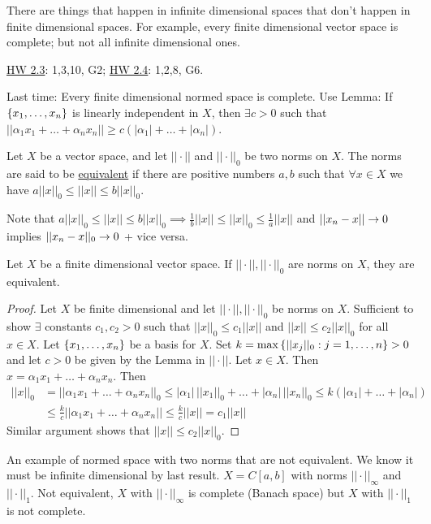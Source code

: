 \documentclass[]{article}
\begin{document}
There are things that happen in infinite dimensional spaces that don't happen in finite dimensional spaces. For example, every finite dimensional vector space is complete; but not all infinite dimensional ones.

\ul{HW 2.3}: 1,3,10, G2;
\ul{HW 2.4}: 1,2,8, G6.

Last time: Every finite dimensional normed space is complete.
Use Lemma:
If $\left\{ x_1,\dots,x_n \right\}$ is linearly independent in $X$, then $\exists c>0$ such that $||\alpha_1x_1+\dots+\alpha_nx_n|| \geq c(|\alpha_1|+\dots+|\alpha_n|)$.

\begin{definition}
	Let $X$ be a vector space, and let $||\cdot||$ and $||\cdot||_0$ be two norms on $X$.
	The norms are said to be \ul{equivalent} if there are positive numbers $a,b$ such that $\forall x\in X$ we have $a||x||_0 \leq ||x|| \leq b||x||_0$.
\end{definition}
\begin{remark}
	Note that $a||x||_0 \leq ||x||\leq b||x||_0 \implies \frac1b||x||\leq ||x||_0 \leq \frac1a||x||$ and $||x_n-x||\rightarrow0$ implies $||x_n-x||_0\rightarrow 0$ + vice versa.
\end{remark}
\begin{theorem}
	Let $X$ be a finite dimensional vector space.
	If $||\cdot||,||\cdot||_0$ are norms on $X$, they are equivalent.
\end{theorem}
\begin{proof}
	Let $X$ be finite dimensional and let $||\cdot||,||\cdot||_0$ be norms on $X$.
	Sufficient to show $\exists$ constants $c_1,c_2>0$ such that \ul{$||x||_0\leq c_1||x||$} and $||x||\leq c_2||x||_0$ for all $x\in X$.
	Let $\left\{ x_1,\dots,x_n \right\}$ be a basis for $X$.
	Set $k = \max\left\{ ||x_j||_0 : j=1,\dots,n \right\}>0$ and let $c>0$ be given by the Lemma in $||\cdot||$.
	Let $x\in X$. Then $x = \alpha_1x_1+\dots+\alpha_nx_n$.
	Then 
	\begin{align*}
		||x||_0 &= ||\alpha_1x_1+\dots+\alpha_nx_n||_0 \leq |\alpha_1|\,||x_1||_0 + \dots + |\alpha_n|\,||x_n||_0 \leq k(|\alpha_1|+\dots+|\alpha_n|) \\
				&\leq \frac kc||\alpha_1x_1+\dots+\alpha_nx_n|| \leq \frac kc||x|| = c_1||x||
	\end{align*}
	Similar argument shows that $||x||\leq c_2||x||_0$.
\end{proof}
\begin{example}
	An example of normed space with two norms that are not equivalent.
	We know it must be infinite dimensional by last result.
	$X = C[a,b]$ with norms $||\cdot||_\infty$ and $||\cdot||_1$.
	Not equivalent, $X$ with $||\cdot||_\infty$ is complete (Banach space) but $X$ with $||\cdot||_1$ is not complete.
\end{example}
\end{document}
